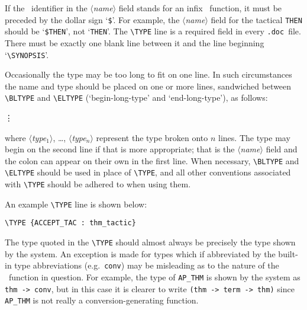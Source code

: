 \documentclass[12pt]{article}
\def\doc{{\tt .doc}}
\def\vsp{{\tt\char`\ }}
\def\meta#1{\(\langle\){\it #1}\(\rangle\)}
\begin{document}
\noindent If the \ML\ identifier in the \meta{name} field stands for an infix
\ML\ function, it must be preceded by the dollar sign `{\small\verb!$!}'.  For
example, the \meta{name} field for the tactical {\small\verb!THEN!} should be
`{\small\verb!$THEN!}', not `{\small\verb!THEN!}'.  The {\small\verb!\TYPE!}
line is  a required field in every \doc\ file.  There must be exactly one
blank line between it and the line beginning `{\small\verb!\SYNOPSIS!}'.

Occasionally the type may be too long to fit on one line. In such circumstances
the name and type should be placed on one or more lines, sandwiched between
{\small\verb!\BLTYPE!} and {\small\verb!\ELTYPE!} (`begin-long-type' and
`end-long-type'), as follows:

\medskip
\noindent\qquad{\small\verb!\BLTYPE!}
\par\noindent\qquad{\small\meta{name}\vsp\ml{:}\vsp\meta{type$_1$}}
\par\noindent\qquad{\small\meta{type$_2$}}
\par\noindent\qquad\vdots
\par\noindent\qquad{\small\meta{type$_n$}}
\par\noindent\qquad{\small\verb!\ELTYPE!}
\medskip

\noindent
where \meta{type$_1$}, \ldots, \meta{type$_n$} represent the type broken onto
$n$ lines. The type may begin on the second line if that is more appropriate;
that is the \meta{name} field and the colon can appear on their own in the
first line. When necessary, {\small\verb!\BLTYPE!} and {\small\verb!\ELTYPE!}
should be used in place of {\small\verb!\TYPE!}, and all other conventions
associated with {\small\verb!\TYPE!} should be adhered to when using them.

An example {\small\verb!\TYPE!} line is shown below:

\smallskip

\begin{boxed}\begin{verbatim}
\TYPE {ACCEPT_TAC : thm_tactic}
\end{verbatim}\end{boxed}

\smallskip

The type quoted in the {\small\verb!\TYPE!} should almost always be precisely
the type shown by the system.  An exception is made for types which if
abbreviated by the built-in type abbreviations (e.g.\ {\small\verb!conv!}) may
be misleading as to the nature of the \ML\ function in question.  For example,
the type of {\small\verb!AP_THM!} is shown by the system as
{\small\verb!thm -> conv!}, but in this case it is clearer to write
{\small\verb!(thm -> term -> thm)!} since {\small\verb!AP_THM!} is not really a
conversion-generating function.
\end{document}
